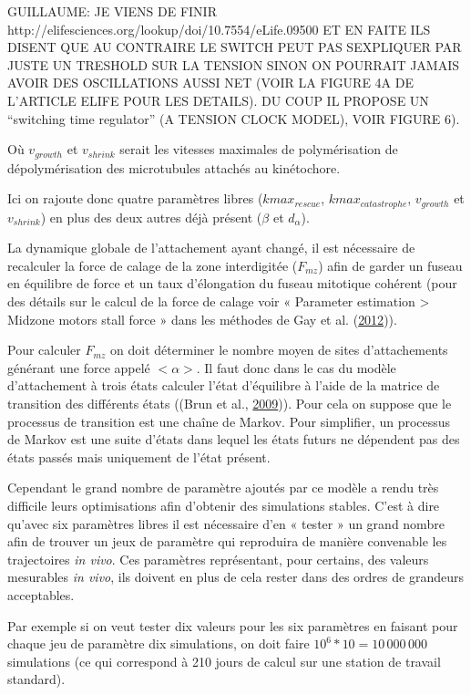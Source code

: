 \documentclass[12pt,a4paper,twoside,openright]{book}
\begin{document}
GUILLAUME: JE VIENS DE FINIR
http://elifesciences.org/lookup/doi/10.7554/eLife.09500 ET EN FAITE ILS
DISENT QUE AU CONTRAIRE LE SWITCH PEUT PAS SEXPLIQUER PAR JUSTE UN
TRESHOLD SUR LA TENSION SINON ON POURRAIT JAMAIS AVOIR DES OSCILLATIONS
AUSSI NET (VOIR LA FIGURE 4A DE L'ARTICLE ELIFE POUR LES DETAILS). DU
COUP IL PROPOSE UN ``switching time regulator'' (A TENSION CLOCK MODEL),
VOIR FIGURE 6).

Où \(v_{growth}\) et \(v_{shrink}\) serait les vitesses maximales de
polymérisation de dépolymérisation des microtubules attachés au
kinétochore.

Ici on rajoute donc quatre paramètres libres (\(kmax_{rescue}\),
\(kmax_{catastrophe}\), \(v_{growth}\) et \(v_{shrink}\)) en plus des
deux autres déjà présent (\(\beta\) et \(d_{\alpha}\)).

La dynamique globale de l'attachement ayant changé, il est nécessaire de
recalculer la force de calage de la zone interdigitée (\(F_{mz}\)) afin
de garder un fuseau en équilibre de force et un taux d'élongation du
fuseau mitotique cohérent (pour des détails sur le calcul de la force de
calage voir « Parameter estimation \textgreater{} Midzone motors stall
force » dans les méthodes de Gay et al.
(\hyperref[ref-Gay2012a]{2012})).

Pour calculer \(F_{mz}\) on doit déterminer le nombre moyen de sites
d'attachements générant une force appelé \(<\alpha>\). Il faut donc dans
le cas du modèle d'attachement à trois états calculer l'état d'équilibre
à l'aide de la matrice de transition des différents états ((Brun et al.,
\hyperref[ref-Brun2009]{2009})). Pour cela on suppose que le processus
de transition est une chaîne de Markov. Pour simplifier, un processus de
Markov est une suite d'états dans lequel les états futurs ne dépendent
pas des états passés mais uniquement de l'état présent.

Cependant le grand nombre de paramètre ajoutés par ce modèle a rendu
très difficile leurs optimisations afin d'obtenir des simulations
stables. C'est à dire qu'avec six paramètres libres il est nécessaire
d'en « tester » un grand nombre afin de trouver un jeux de paramètre qui
reproduira de manière convenable les trajectoires \emph{in vivo}. Ces
paramètres représentant, pour certains, des valeurs mesurables \emph{in
vivo}, ils doivent en plus de cela rester dans des ordres de grandeurs
acceptables.

Par exemple si on veut tester dix valeurs pour les six paramètres en
faisant pour chaque jeu de paramètre dix simulations, on doit faire
\(10^6 * 10 = 10\,000\,000\) simulations (ce qui correspond à 210 jours
de calcul sur une station de travail standard).
\end{document}
